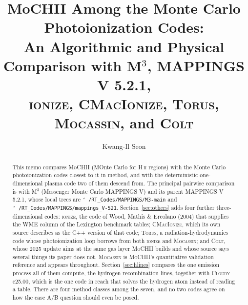 \documentclass[english,a4paper]{my_memo}
\newcommand{\code}[1]{\texttt{#1}}
\newcommand{\MoCHII}{\textsc{MoCHII}}
\newcommand{\Mthree}{M$^3$}
\newcommand{\Mappings}{MAPPINGS V 5.2.1}
\newcommand{\Wood}{\textsc{ionize}}
\newcommand{\CMI}{\textsc{CMacIonize}}
\newcommand{\Torus}{\textsc{Torus}}
\newcommand{\Mocassin}{\textsc{Mocassin}}
\newcommand{\Cloudy}{\textsc{Cloudy}}
\newcommand{\Colt}{\textsc{Colt}}
\newcommand{\HII}{H\,\textsc{ii}}
\begin{document}
\title{MoCHII Among the Monte Carlo Photoionization Codes:\\
An Algorithmic and Physical Comparison with M$^3$, MAPPINGS V 5.2.1,\\
\textsc{ionize}, \textsc{CMacIonize}, \textsc{Torus}, \textsc{Mocassin},
and \textsc{Colt}}
\author{Kwang-Il Seon}
\date{\docmoddate}
\maketitle

\begin{abstract}
This memo compares \MoCHII{} (MOnte Carlo for \HII{} regions) with the
Monte Carlo photoionization codes closest to it in method, and with the
deterministic one-dimensional plasma code two of them descend from.  The
principal pairwise comparison is with \Mthree{} (Messenger Monte Carlo
MAPPINGS V) and its parent \Mappings{}, whose local trees are
\code{\char`~/RT\_Codes/MAPPINGS/M3-main} and
\code{\char`~/RT\_Codes/MAPPINGS/mappings\_V-521}.
Section~\ref{sec:others} adds four further three-dimensional codes:
\Wood{}, the code of Wood, Mathis \& Ercolano (2004) that supplies the WME
column of the Lexington benchmark tables; \CMI{}, which its own source
describes as the C++ version of that code; \Torus{}, a
radiation-hydrodynamics code whose photoionization loop borrows from both
\Wood{} and \Mocassin{}; and \Colt{}, whose 2025 update aims at the same
gas layer \MoCHII{} builds and whose source says several things its paper
does not.  \Mocassin{} is \MoCHII{}'s quantitative validation
reference and appears throughout.  Section~\ref{sec:hlines} compares the one
emission process all of them compute, the hydrogen recombination lines,
together with \Cloudy{} c25.00, which is the one code in reach that solves the
hydrogen atom instead of reading a table.  There are four method classes among
the seven, and no two codes agree on how the case A/B question should even be
posed.


\end{abstract}
\end{document}
